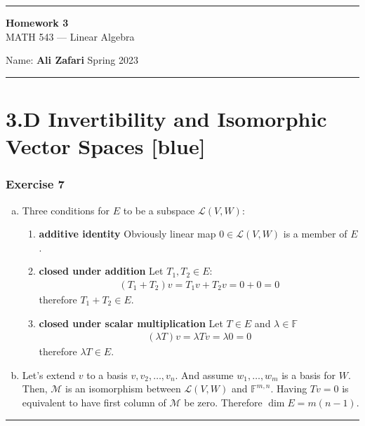 \documentclass[12pt, letterpaper]{scrartcl}
\newcommand{\F}{\mathbb{F}}
\begin{document}
\begin{center}
    \hrule
    \vspace{0.4cm}
    { \textbf{{\large Homework 3}} \\ MATH 543 --- Linear Algebra}
\end{center}
{ Name: \textbf{Ali Zafari} \hspace{\fill} Spring 2023 } \newline\hrule

\section*{3.D Invertibility and Isomorphic Vector Spaces \xrfill[2pt]{3pt}[blue]}
\subsubsection*{Exercise 7}
\begin{enumerate}[(a)]
    \item 
    Three conditions for $E$ to be a subspace $\mathcal{L}(V,W)$:
    \begin{enumerate}[1.]
        \item \textbf{additive identity} Obviously linear map $0\in \mathcal{L}(V,W)$ is a member of $E$.
        \item \textbf{closed under addition} Let $T_1,T_2\in E$:
        \begin{align*}
            (T_1+T_2)v=T_1v+T_2v=0+0=0
        \end{align*}
        therefore $T_1+T_2\in E$.
        \item \textbf{closed under scalar multiplication} Let $T\in E$ and $\lambda\in\F$
        \begin{align*}
            (\lambda T)v=\lambda Tv=\lambda 0=0
        \end{align*}
        therefore $\lambda T\in E$.
    \end{enumerate}

    \item 
    Let's extend $v$ to a basis $v, v_2, \dots, v_n$. And assume $w_1, \dots, w_m$ is a basis for $W$. Then, $\mathcal{M}$ is an isomorphism between $\mathcal{L}(V,W)$ and $\F^{m,n}$. Having $Tv=0$ is equivalent to have first column of $\mathcal{M}$ be zero. Therefore $\dim E=m(n-1)$.
    
\end{enumerate}
\vskip1mm\hrule
\end{document}
